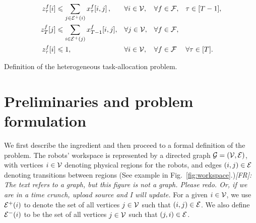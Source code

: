 \documentclass[conference]{IEEEtran}
\newcommand{\frmargin}[2]{{\color{brown}#1}\marginpar{\color{brown}\raggedright\footnotesize [FR]:#2}}
\newcommand{\frline}[2]{{\color{blue}#1}{\em \color{blue}[FR]: #2}}
\newcommand{\frmargin}[2]{#1}
\newcommand{\frline}[2]{#1}
\begin{document}
\begin{table}[!ht]
{\begin{minipage}[t]{1\textwidth - 2\fboxsep - 2\fboxrule}
\begin{subequations}
\begin{align}
          z^f_\tau[i] & \leqslant  \sum_{j\in \mathcal{E}^+(i)} x^f_\tau[i,j] \thinspace, & & \forall i \in \mathcal{V},  & &  \forall f\in\mathcal{F}, && \tau\in [T-1], \label{eq:bound_z_1} \\ 
          z^f_T[j] & \leqslant   \sum_{i\in \mathcal{E}^+(j)} x^f_{T-1}[i,j], & & \forall j \in \mathcal{V}, & &  \forall f\in\mathcal{F},  \label{eq:bound_z_2} \\ 
          z^f_\tau[i] & \leqslant 1 , && \forall i\in \mathcal{V}, && \forall f\in \mathcal{F} && \forall\tau\in [T]. \label{eq:bound_z_3}
        \end{align}
      \end{subequations}
    \end{minipage}}
\vspace{5pt}
\caption{Definition of the heterogeneous task-allocation problem.}
\label{tbl:heterogeneous}
\end{table}


\section{Preliminaries and problem formulation \label{sec:problem_statement}}
We first describe the \frmargin{ingredient}{?} and then proceed to a formal definition of the problem.
%
%
The robots' workspace is represented by a directed graph $\mathcal{G}=(\mathcal{V},\mathcal{E})$, with vertices $i\in \mathcal{V}$ denoting physical regions for the robots, and edges $(i,j)\in \mathcal{E}$ denoting transitions between regions \frline{(See example in Fig.~\ref{fig:workspace}.)}{The text refers to a graph, but this figure is not a graph. Please redo. Or, if we are in a time crunch, upload source and I will update.} For a given $i\in \mathcal{V}$, we use $\mathcal{E}^+(i)$ to denote the set of all vertices $j \in \mathcal{V}$ such that $(i,j)\in \mathcal{E}$. We also define $\mathcal{E}^-(i)$ to be the set of all vertices $j \in \mathcal{V}$ such that $(j,i)\in \mathcal{E}$.
\end{document}

